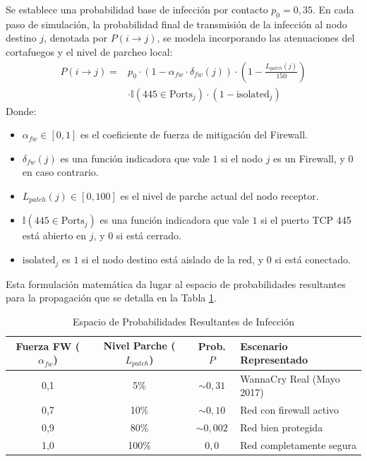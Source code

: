 Se establece una probabilidad base de infección por contacto $p_0 = 0,35$. En cada paso de simulación, la probabilidad final de transmisión de la infección al nodo destino $j$, denotada por $P(i \rightarrow j)$, se modela incorporando las atenuaciones del cortafuegos y el nivel de parcheo local:
\begin{equation}
\begin{split}
    P(i \rightarrow j) = {} & p_0 \cdot (1 - \alpha_{fw} \cdot \delta_{fw}(j)) \cdot \left(1 - \frac{L_{patch}(j)}{150}\right) \\
    & \cdot \mathbb{I}(445 \in \text{Ports}_j) \cdot (1 - \text{isolated}_j)
\end{split}
\label{eq:probability_combined}
\end{equation}
Donde:
\begin{itemize}
    \item $\alpha_{fw} \in [0, 1]$ es el coeficiente de fuerza de mitigación del Firewall.
    \item $\delta_{fw}(j)$ es una función indicadora que vale $1$ si el nodo $j$ es un Firewall, y $0$ en caso contrario.
    \item $L_{patch}(j) \in [0, 100]$ es el nivel de parche actual del nodo receptor.
    \item $\mathbb{I}(445 \in \text{Ports}_j)$ es una función indicadora que vale $1$ si el puerto TCP 445 está abierto en $j$, y $0$ si está cerrado.
    \item $\text{isolated}_j$ es $1$ si el nodo destino está aislado de la red, y $0$ si está conectado.
\end{itemize}

Esta formulación matemática da lugar al espacio de probabilidades resultantes para la propagación que se detalla en la Tabla \ref{tab:espacio_probabilidades}.

\begin{table}[htbp]
\caption{Espacio de Probabilidades Resultantes de Infección}
\label{tab:espacio_probabilidades}
\begin{center}
\begin{tabular}{|c|c|c|p{}|}
\hline
\textbf{Fuerza FW} ($\alpha_{fw}$) & \textbf{Nivel Parche} ($L_{patch}$) & \textbf{Prob. $P$} & \textbf{Escenario Representado} \\ \hline
0,1 & 5\% & $\sim 0,31$ & WannaCry Real (Mayo 2017) \\ \hline
0,7 & 10\% & $\sim 0,10$ & Red con firewall activo \\ \hline
0,9 & 80\% & $\sim 0,002$ & Red bien protegida \\ \hline
1,0 & 100\% & $0,0$ & Red completamente segura \\ \hline
\end{tabular}
\end{center}
\end{table}

